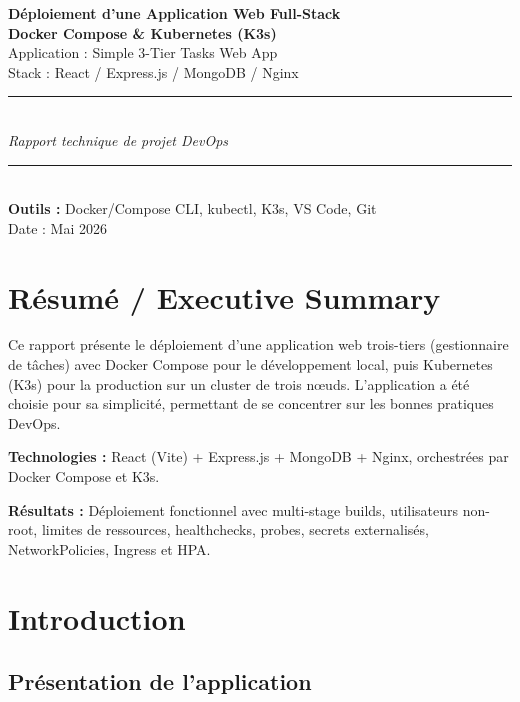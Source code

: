 \documentclass[12pt,a4paper]{report}
\begin{document}
\begin{titlepage}
\centering
\vspace*{2cm}
{\Huge\bfseries Déploiement d'une Application Web Full-Stack}\\[0.5cm]
{\LARGE\bfseries Docker Compose \& Kubernetes (K3s)}\\[2cm]
{\Large Application : Simple 3-Tier Tasks Web App}\\[0.3cm]
{\large Stack : React / Express.js / MongoDB / Nginx}\\[3cm]
\rule{\textwidth}{1pt}\\[0.5cm]
{\large\itshape Rapport technique de projet DevOps}\\[0.5cm]
\rule{\textwidth}{1pt}\\[3cm]
{\large\textbf{Outils :}} Docker/Compose CLI, kubectl, K3s, VS Code, Git\\[2cm]
{\large Date : Mai 2026}
\vfill
\end{titlepage}

\chapter*{Résumé / Executive Summary}

Ce rapport présente le déploiement d'une application web trois-tiers (gestionnaire de tâches) avec Docker Compose pour le développement local, puis Kubernetes (K3s) pour la production sur un cluster de trois nœuds. L'application a été choisie pour sa simplicité, permettant de se concentrer sur les bonnes pratiques DevOps.

\textbf{Technologies :} React (Vite) + Express.js + MongoDB + Nginx, orchestrées par Docker Compose et K3s.

\textbf{Résultats :} Déploiement fonctionnel avec multi-stage builds, utilisateurs non-root, limites de ressources, healthchecks, probes, secrets externalisés, NetworkPolicies, Ingress et HPA.

\chapter{Introduction}

\section{Présentation de l'application}
\end{document}
